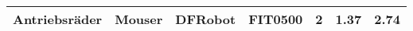 \documentclass[main.tex]{subfiles} %
\begin{document}
\begin{table}[h]
{\begin{tabular}{|p{3cm}|p{2.5cm}|p{2.5cm}|p{3cm}|p{1cm}|p{1.5cm}|p{1cm}|}
            Antriebsräder                     &Mouser              & DFRobot                      & FIT0500                 & 2               & 1.37                      & 2.74                        \\ \hline

\end{tabular}}
\end{table}
\end{document}
